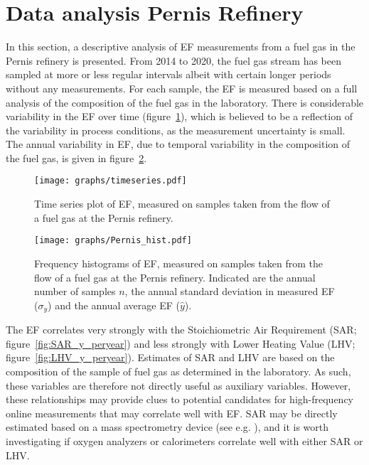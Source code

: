\clearpage
\section{Data analysis Pernis Refinery}\label{Pernis}
In this section, a descriptive analysis of EF measurements from a fuel gas in the Pernis refinery is presented. 
From 2014 to 2020, the fuel gas stream has been sampled at more or less regular intervals albeit with certain longer periods without any measurements. For each sample, the EF is measured based on a full analysis of the composition of the fuel gas in the laboratory. There is considerable variability in the EF over time (figure~\ref{fig:timeseries}), which is believed to be a reflection of the variability in process conditions, as the measurement uncertainty is small. The annual variability in EF, due to temporal variability in the composition of the fuel gas, is given in figure~\ref{fig:Pernis_hist}.

\begin{figure}[h]
	\centering
	\texttt{[image: graphs/timeseries.pdf]}
	\caption{Time series plot of EF, measured on samples taken from the flow of a fuel gas at the Pernis refinery.}
	\label{fig:timeseries}
\end{figure}

\begin{figure}[h]
	\centering
	\texttt{[image: graphs/Pernis\_hist.pdf]}
	\caption{Frequency histograms of EF, measured on samples taken from the flow of a fuel gas at the Pernis refinery. Indicated are the annual number of samples $n$, the annual standard deviation in measured EF ($\sigma_y$) and the annual average EF ($\hat{y}$).}
	\label{fig:Pernis_hist}
\end{figure}

The EF correlates very strongly with the Stoichiometric Air Requirement (SAR; figure~\ref{fig:SAR_y_peryear}) and less strongly with Lower Heating Value (LHV; figure~\ref{fig:LHV_y_peryear}). Estimates of SAR and LHV are based on the composition of the sample of fuel gas as determined in the laboratory. As such, these variables are therefore not directly useful as auxiliary variables. However, these relationships may provide clues to potential candidates for high-frequency online measurements that may correlate well with EF. SAR may be directly estimated based on a mass spectrometry device (see e.g. \cite{Merriman}), and it is worth investigating if oxygen analyzers or calorimeters correlate well with either SAR or LHV.

